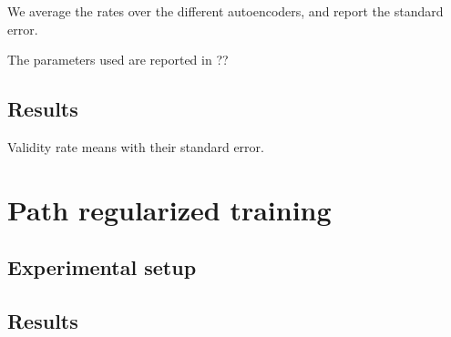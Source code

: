 \documentclass[../main.tex]{subfiles}
\begin{document}
We average the rates over the different autoencoders, and report the standard error.

The parameters used are reported in ?? \citenote{}

\subsection{Results}

\begin{table}
    \caption{Validity rate means with their standard error.}
    
\end{table}

\section{Path regularized training}

\subsection{Experimental setup}

\subsection{Results}
\end{document}

